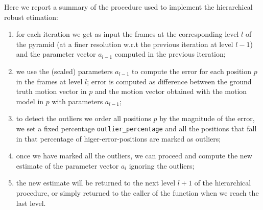 Here we report a summary of the procedure used to implement the hierarchical robust etimation:
\begin{enumerate}
    \item for each iteration we get as input the frames at the corresponding level $l$ of the pyramid (at a finer resolution w.r.t the previous iteration at level $l-1$) and the parameter vector $a_{l-1}$ computed in the previous iteration;
    \item we use the (scaled) parameters $a_{l-1}$ to compute the error for each position $p$ in the frames at level $l$; error is computed as difference between the ground truth motion vector in $p$ and the motion vector obtained with the motion model in $p$ with parameters $a_{l-1}$;
    \item to detect the outliers we order all positions $p$ by the magnitude of the error, we set a fixed percentage \texttt{outlier\_percentage} and all the positions that fall in that percentage of higer-error-positions are marked as outliers;
    \item once we have marked all the outliers, we can proceed and compute the new estimate of the parameter vector $a_{l}$ ignoring the outliers;
    \item the new estimate will be returned to the next level $l+1$ of the hierarchical procedure, or simply returned to the caller of the function when we reach the last level.
\end{enumerate}

